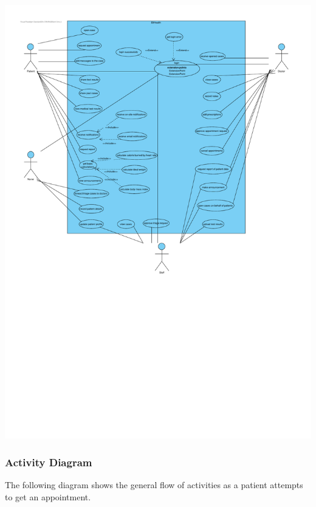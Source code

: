 \documentclass[a4paper, 12pt, titlepage]{article}
\begin{document}
  \includegraphics[width=\linewidth]{use_case_diag}

  \pagebreak
  \subsubsection{Activity Diagram}
  
  The following diagram shows the general flow of activities as a patient attempts to get an appointment.
\end{document}
